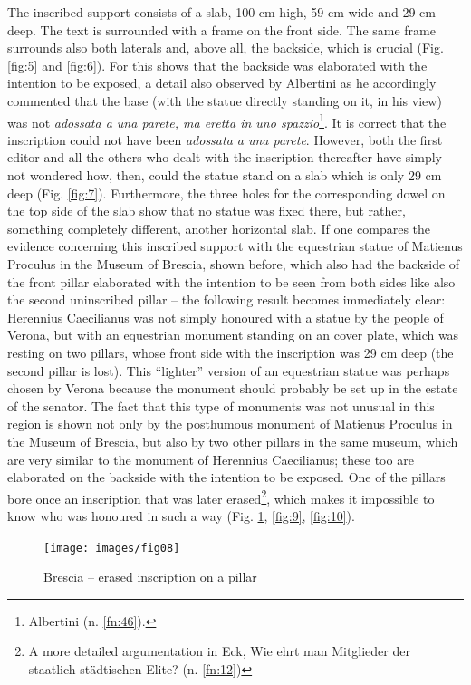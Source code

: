 \documentclass[amsthm,ebook]{saparticle}
\begin{document}
The inscribed support consists of a slab, 100 cm high, 59 cm wide and 29 cm deep. 
The text is surrounded with a frame on the front side. The same frame surrounds 
also both laterals and, above all, the backside, which is crucial (Fig. \ref{fig:5} and \ref{fig:6}). 
For this shows that the backside was elaborated with the intention to be exposed, 
a detail also observed by Albertini as he accordingly commented that the base (with 
the statue directly standing on it, in his view) was not \textit{adossata a una 
parete, ma eretta in uno spazzio}\footnote{Albertini (n. \ref{fn:46}).}. It is correct that the inscription could not 
have been \textit{adossata a una parete}. However, both the first editor and all 
the others who dealt with the inscription thereafter have simply not wondered how, 
then, could the statue stand on a slab which is only 29 cm deep (Fig. \ref{fig:7}). Furthermore, 
the three holes for the corresponding dowel on the top side of the slab show that 
no statue was fixed there, but rather, something completely different, another 
horizontal slab. If one compares the evidence concerning this inscribed support 
with the equestrian statue of Matienus Proculus in the Museum of Brescia, shown 
before, which also had the backside of the front pillar elaborated with the intention 
to be seen from both sides like also the second uninscribed pillar – the following 
result becomes immediately clear: Herennius Caecilianus was not simply honoured 
with a statue by the people of Verona, but with an equestrian monument standing 
on an cover plate, which was resting on two pillars, whose front side with the 
inscription was 29 cm deep (the second pillar is lost). This ``lighter'' 
version of an equestrian statue was perhaps chosen by Verona because the monument 
should probably be set up in the estate of the senator. The fact that this type 
of monuments was not unusual in this region is shown not only by the posthumous 
monument of Matienus Proculus in the Museum of Brescia, but also by two other pillars 
in the same museum, which are very similar to the monument of Herennius Caecilianus; 
these too are elaborated on the backside with the intention to be exposed. One 
of the pillars bore once an inscription that was later erased\footnote{A more detailed argumentation in Eck, Wie ehrt man Mitglieder der staatlich-städtischen Elite? (n. \ref{fn:12})}, which makes it impossible 
to know who was honoured in such a way (Fig. \ref{fig:8}, \ref{fig:9}, \ref{fig:10}).  

\begin{figure}[!bp]
\centering
 \texttt{[image: images/fig08]}
\caption{Brescia -- erased inscription on a pillar}
\label{fig:8}
\end{figure}
\end{document}
